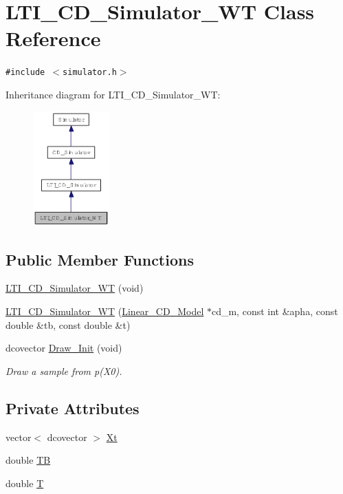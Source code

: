 \hypertarget{class_l_t_i___c_d___simulator___w_t}{
\section{LTI\_\-CD\_\-Simulator\_\-WT Class Reference}
\label{class_l_t_i___c_d___simulator___w_t}
}
{\tt \#include $<$simulator.h$>$}

Inheritance diagram for LTI\_\-CD\_\-Simulator\_\-WT:\nopagebreak
\begin{figure}[H]
\begin{center}
\leavevmode
\includegraphics[width=83pt]{class_l_t_i___c_d___simulator___w_t__inherit__graph}
\end{center}
\end{figure}
\subsection*{Public Member Functions}
\begin{CompactItemize}
\item 
\hyperlink{class_l_t_i___c_d___simulator___w_t_b19915f3fc8903845fe748efd495fb5a}{LTI\_\-CD\_\-Simulator\_\-WT} (void)
\item 
\hyperlink{class_l_t_i___c_d___simulator___w_t_2d512981a1e18a2fab3e2ad7b5ea9b43}{LTI\_\-CD\_\-Simulator\_\-WT} (\hyperlink{class_linear___c_d___model}{Linear\_\-CD\_\-Model} $\ast$cd\_\-m, const int \&apha, const double \&tb, const double \&t)
\item 
dcovector \hyperlink{class_l_t_i___c_d___simulator___w_t_a63eaac608a5f214468dc13d34f8f20f}{Draw\_\-Init} (void)
\begin{CompactList}\small\item\em Draw a sample from p(X0). \item\end{CompactList}\end{CompactItemize}
\subsection*{Private Attributes}
\begin{CompactItemize}
\item 
vector$<$ dcovector $>$ \hyperlink{class_l_t_i___c_d___simulator___w_t_97dfbe7f66cefff7b32d3288aece9964}{Xt}
\item 
double \hyperlink{class_l_t_i___c_d___simulator___w_t_f03a9456dc6940c1c3f772336d911c3e}{TB}
\item 
double \hyperlink{class_l_t_i___c_d___simulator___w_t_5ceaf9896225588b2aff938b13e86996}{T}
\end{CompactItemize}


